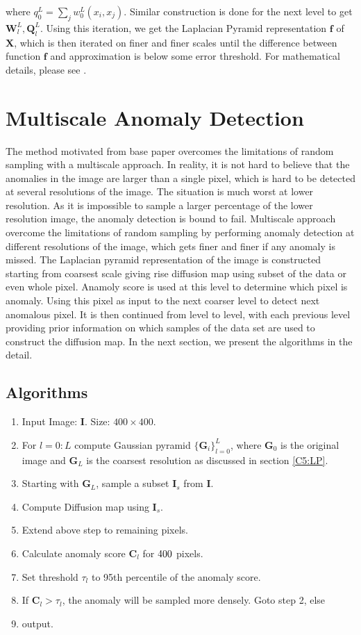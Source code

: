 where $q^{L}_{0} = \sum_{j}w_{0}^{L}(x_{i},x_{j})$. Similar construction is done for the next level to get $\mathbf{W}^{L}_{l}, \mathbf{Q}^{L}_{l}$. Using this iteration, we get the Laplacian Pyramid representation $\mathbf{f}$ of $\mathbf{X}$, which is then iterated on finer and finer scales until the
difference between function $\mathbf{f}$ and approximation is below some error threshold. For mathematical details, please see \citep{Gal2013}.

\section{Multiscale Anomaly Detection}
\label{C5:MS}
The method motivated from base paper\citep{Gal2013} overcomes the limitations of random sampling with a multiscale approach. In reality, it is not hard to believe that the anomalies in the image are larger than a single pixel, which is hard to be detected at several resolutions of the image. The situation is much worst at lower resolution. As it is impossible to sample a larger percentage of the lower resolution image, the anomaly detection is bound to fail. Multiscale  approach  overcome the limitations of random sampling by performing anomaly detection at different resolutions of the image, which gets finer and finer if any anomaly is missed. The Laplacian pyramid representation of the image is constructed starting from coarsest scale giving rise diffusion map using subset of the data or even whole pixel. Anamoly score is used at this level to determine which pixel is anomaly. Using this pixel as input to the next coarser level to detect next anomalous pixel. It is then continued from level to level, with each previous level providing prior information on which samples of the data set are used to construct the diffusion map. In the next section, we present the algorithms in the detail.

\subsection{Algorithms}
\label{C5:Imp}
\begin{enumerate}
\item Input Image: $\mathbf{I}$. Size: $400\times400$.
\item For $l = 0:L$ compute Gaussian pyramid $\{\mathbf{G}_{i}\}^{L}_{l=0}$, where $\mathbf{G}_{0}$ is the original image and $\mathbf{G}_{L}$ is the coarsest resolution as discussed in section \ref{C5:LP}.
\item Starting with $\mathbf{G}_L$, sample a subset $\mathbf{I}_{s}$ from $\mathbf{I}$.
\item Compute Diffusion map using $\mathbf{I}_{s}$. 
\item Extend above step to remaining pixels.
\item Calculate anomaly score $\mathbf{C}_l$ for $400\time400$ pixels.
\item Set threshold $\tau_{l}$ to 95th percentile of the anomaly score.
\item If $\mathbf{C}_l > \tau_{l}$, the anomaly will be sampled more densely. Goto step 2, else 
\item output.
\end{enumerate}
 
